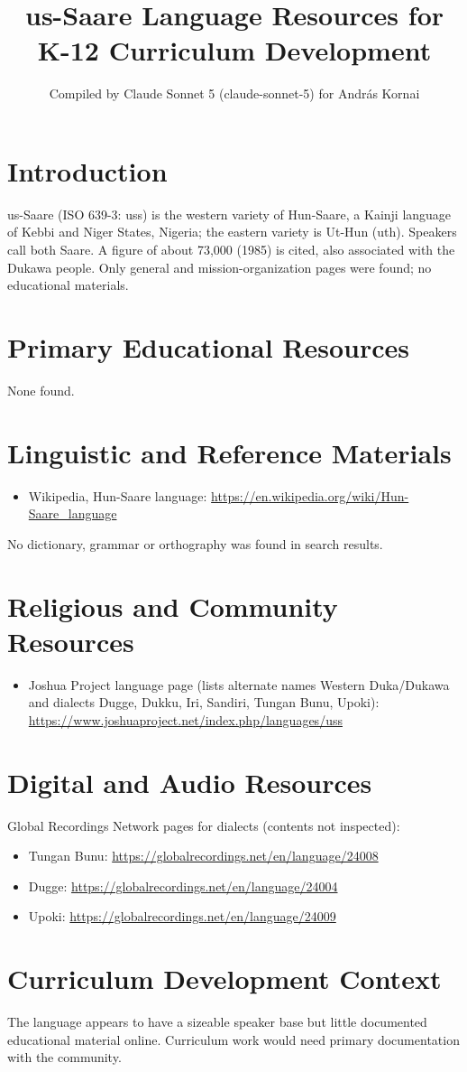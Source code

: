 \documentclass[12pt]{article}
\title{us-Saare Language Resources for K-12 Curriculum Development}
\author{Compiled by Claude Sonnet 5 (claude-sonnet-5) for Andr\'as Kornai}
\date{}
\begin{document}
\maketitle

\section{Introduction}
us-Saare (ISO 639-3: uss) is the western variety of Hun-Saare, a Kainji language of Kebbi and Niger States, Nigeria; the eastern variety is Ut-Hun (uth). Speakers call both Saare. A figure of about 73,000 (1985) is cited, also associated with the Dukawa people. Only general and mission-organization pages were found; no educational materials.

\section{Primary Educational Resources}
None found.

\section{Linguistic and Reference Materials}
\begin{itemize}
\item Wikipedia, Hun-Saare language: \url{https://en.wikipedia.org/wiki/Hun-Saare_language}
\end{itemize}
No dictionary, grammar or orthography was found in search results.

\section{Religious and Community Resources}
\begin{itemize}
\item Joshua Project language page (lists alternate names Western Duka/Dukawa and dialects Dugge, Dukku, Iri, Sandiri, Tungan Bunu, Upoki): \url{https://www.joshuaproject.net/index.php/languages/uss}
\end{itemize}

\section{Digital and Audio Resources}
Global Recordings Network pages for dialects (contents not inspected):
\begin{itemize}
\item Tungan Bunu: \url{https://globalrecordings.net/en/language/24008}
\item Dugge: \url{https://globalrecordings.net/en/language/24004}
\item Upoki: \url{https://globalrecordings.net/en/language/24009}
\end{itemize}

\section{Curriculum Development Context}
The language appears to have a sizeable speaker base but little documented educational material online. Curriculum work would need primary documentation with the community.
\end{document}
